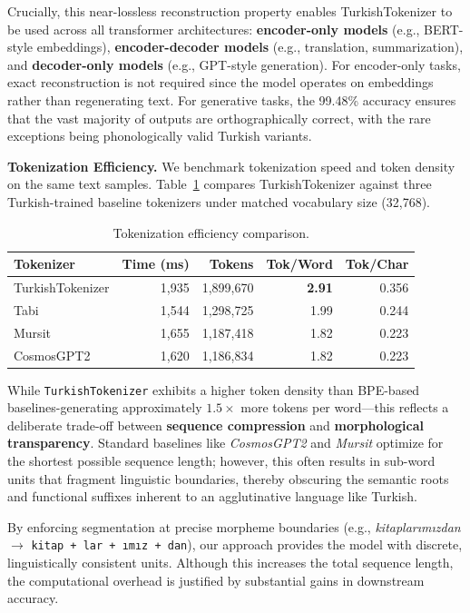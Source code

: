 Crucially, this near-lossless reconstruction property enables TurkishTokenizer to be used across all transformer architectures: \textbf{encoder-only models} (e.g., BERT-style embeddings), \textbf{encoder-decoder models} (e.g., translation, summarization), and \textbf{decoder-only models} (e.g., GPT-style generation). For encoder-only tasks, exact reconstruction is not required since the model operates on embeddings rather than regenerating text. For generative tasks, the 99.48\% accuracy ensures that the vast majority of outputs are orthographically correct, with the rare exceptions being phonologically valid Turkish variants.

\textbf{Tokenization Efficiency.} We benchmark tokenization speed and token density on the same text samples. Table~\ref{tab:tokenization_efficiency} compares TurkishTokenizer against three Turkish-trained baseline tokenizers under matched vocabulary size (32,768).

\begin{table}[H]
\centering
\caption{Tokenization efficiency comparison.}
\label{tab:tokenization_efficiency}
\begin{tabular}{lrrrr}
\toprule
\textbf{Tokenizer} & \textbf{Time (ms)} & \textbf{Tokens} & \textbf{Tok/Word} & \textbf{Tok/Char} \\
\midrule
TurkishTokenizer & 1,935 & 1,899,670 & \textbf{2.91} & 0.356 \\
Tabi & 1,544 & 1,298,725 & 1.99 & 0.244 \\
Mursit & 1,655 & 1,187,418 & 1.82 & 0.223 \\
CosmosGPT2 & 1,620 & 1,186,834 & 1.82 & 0.223 \\
\bottomrule
\end{tabular}
\end{table}

While \texttt{TurkishTokenizer} exhibits a higher token density than BPE-based baselines-generating approximately $1.5\times$ more tokens per word—this reflects a deliberate trade-off between \textbf{sequence compression} and \textbf{morphological transparency}. Standard baselines like \textit{CosmosGPT2} and \textit{Mursit} optimize for the shortest possible sequence length; however, this often results in sub-word units that fragment linguistic boundaries, thereby obscuring the semantic roots and functional suffixes inherent to an agglutinative language like Turkish.

By enforcing segmentation at precise morpheme boundaries (e.g., \textit{kitaplarımızdan} $\rightarrow$ \texttt{kitap + lar + ımız + dan}), our approach provides the model with discrete, linguistically consistent units. Although this increases the total sequence length, the computational overhead is justified by substantial gains in downstream accuracy.
